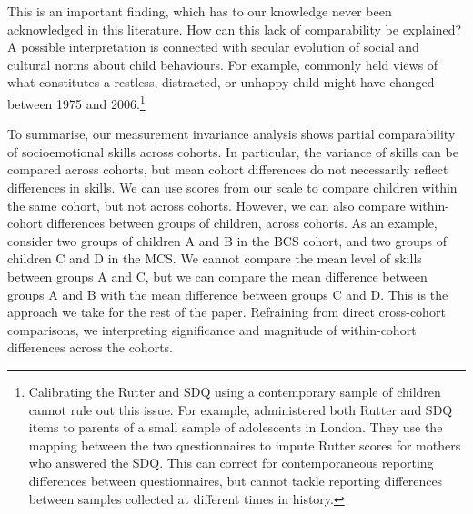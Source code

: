 This is an important finding, which has to our knowledge never been acknowledged in this literature. How can this lack of comparability be explained?  A possible interpretation is connected with secular evolution of social and cultural norms about child behaviours. For example, commonly held views of what constitutes a restless, distracted, or unhappy child might have changed between 1975 and 2006.\footnote{Calibrating the Rutter and SDQ using a contemporary sample of children cannot rule out this issue. For example, \citet{Collishaw2004} administered both Rutter and SDQ items to parents of a small sample of adolescents in London. They use the mapping between the two questionnaires to impute Rutter scores for mothers who answered the SDQ. This can correct for contemporaneous reporting differences between questionnaires, but cannot tackle reporting differences between samples collected at different times in history.}

To summarise, our measurement invariance analysis shows partial comparability of socioemotional skills across cohorts. In particular, the variance of skills can be compared across cohorts, but mean cohort differences do not necessarily reflect differences in skills. We can use scores from our scale to compare children within the same cohort, but not across cohorts. However, we can also compare within-cohort differences between groups of children, across cohorts. As an example, consider two groups of children A and B in the BCS cohort, and two groups of children C and D in the MCS. We cannot compare the mean level of skills between groups A and C, but we can compare the mean difference between groups A and B with the mean difference between groups C and D. This is the approach we take for the rest of the paper. Refraining from direct cross-cohort comparisons, we interpreting significance and magnitude of within-cohort differences across the cohorts.


